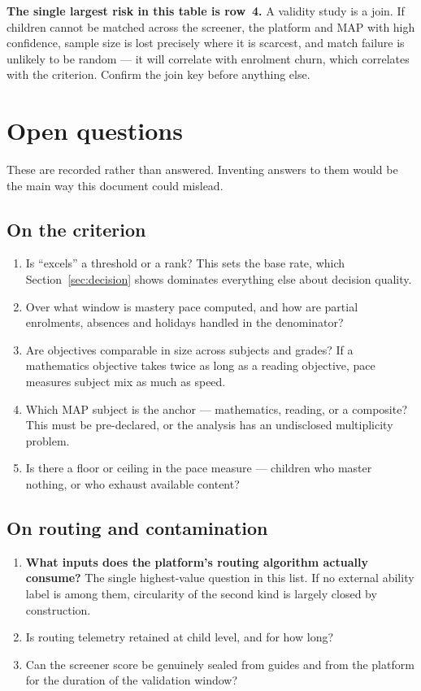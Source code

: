 \documentclass[11pt,a4paper]{article}
\begin{document}
\textbf{The single largest risk in this table is row~4.} A validity study is a
join. If children cannot be matched across the screener, the platform and MAP
with high confidence, sample size is lost precisely where it is scarcest, and
match failure is unlikely to be random --- it will correlate with enrolment
churn, which correlates with the criterion. Confirm the join key before anything
else.

\section{Open questions}
\label{sec:open}

These are recorded rather than answered. Inventing answers to them would be the
main way this document could mislead.

\subsection*{On the criterion}
\begin{enumerate}[leftmargin=1.6em,itemsep=0.15em,start=1]
\item Is ``excels'' a threshold or a rank? This sets the base rate, which
Section~\ref{sec:decision} shows dominates everything else about decision
quality.
\item Over what window is mastery pace computed, and how are partial enrolments,
absences and holidays handled in the denominator?
\item Are objectives comparable in size across subjects and grades? If a
mathematics objective takes twice as long as a reading objective, pace measures
subject mix as much as speed.
\item Which MAP subject is the anchor --- mathematics, reading, or a composite?
This must be pre-declared, or the analysis has an undisclosed multiplicity
problem.
\item Is there a floor or ceiling in the pace measure --- children who master
nothing, or who exhaust available content?
\end{enumerate}

\subsection*{On routing and contamination}
\begin{enumerate}[leftmargin=1.6em,itemsep=0.15em,start=6]
\item \textbf{What inputs does the platform's routing algorithm actually
consume?} The single highest-value question in this list. If no external ability
label is among them, circularity of the second kind is largely closed by
construction.
\item Is routing telemetry retained at child level, and for how long?
\item Can the screener score be genuinely sealed from guides and from the
platform for the duration of the validation window?
\end{enumerate}
\end{document}
